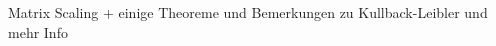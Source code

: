 \documentclass[11pt,a4paper]{article}
\newtheorem{proposition}[theorem]{Proposition}
\newtheorem{remark}[theorem]{Bemerkung}
\numberwithin{equation}{section}
\begin{document}
	Matrix Scaling + einige Theoreme und Bemerkungen zu Kullback-Leibler und mehr Info \cite{vialard2019elementary}
	

\end{document}
